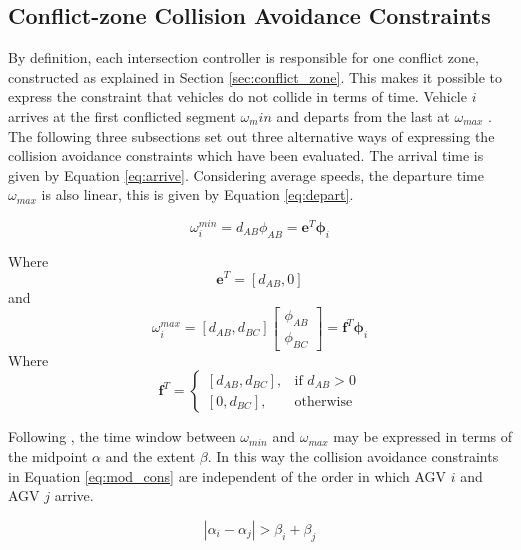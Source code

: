 \subsection{Conflict-zone Collision Avoidance Constraints} 
By definition, each intersection controller is responsible for one conflict zone, constructed as explained in Section \ref{sec:conflict_zone}. This makes it
possible to express the constraint that vehicles do not collide
in terms of time. Vehicle $i$ arrives at the first conflicted
segment $\omega_min$ and departs from the last at $\omega_{max}$ . The following three subsections set out three alternative ways
of expressing the collision avoidance constraints which have
been evaluated. The arrival time is given by Equation \ref{eq:arrive}. Considering average speeds, the departure time $\omega_{max}$ is also linear, this is given by Equation \ref{eq:depart}.

\begin{equation}
\label{eq:arrive}
\omega_i^{min} = d_{AB} \phi_{AB} = \bm{e}^T \bm{\phi}_i
\end{equation}

Where
\begin{equation}
\label{eq:e_vec}
\bm{e}^T = [d_{AB}, 0]
\end{equation}
and 
\begin{equation}
\label{eq:depart}
\omega_i^{max} = [d_{AB}, d_{BC}]\left[\begin{array}{c}
\phi_{AB}\\
\phi_{BC}
\end{array}\right] = \bm{f}^T \bm{\phi}_i
\end{equation}
Where
\begin{equation}
\label{eq:f_vec}
\bm{f}^T = \begin{cases}
    [d_{AB}, d_{BC}],& \text{if } d_{AB}> 0\\
    [0, d_{BC}],              & \text{otherwise}
\end{cases}
\end{equation}

Following \cite{Digani2019}, the time window between $\omega_{min}$ and $\omega_{max}$ may be expressed in terms of the midpoint $\alpha$ and the extent $\beta$. In this way the collision avoidance constraints in Equation \ref{eq:mod_cons} are independent of the order in which AGV $i$ and AGV $j$ arrive.

\begin{equation}
\label{eq:mod_cons}
|\alpha_i - \alpha_j|> \beta_i + \beta_j
\end{equation}

